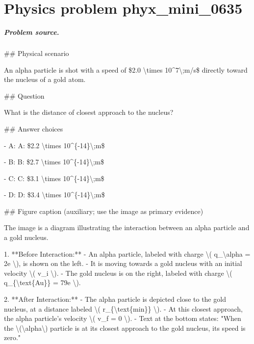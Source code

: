 
\chapter{Physics problem phyx\_mini\_0635}
\label{ch:PhyXMiniProblems_problem_phyx_mini_0635}

\paragraph{Problem source.}
\#\# Physical scenario

An alpha particle is shot with a speed of \$2.0 \textbackslash{}times 10\textasciicircum{}7\textbackslash{};m/s\$ directly toward the nucleus of a gold atom.

\#\# Question

What is the distance of closest approach to the nucleus?

\#\# Answer choices

- A: A: \$2.2 \textbackslash{}times 10\textasciicircum{}\{-14\}\textbackslash{};m\$

- B: B: \$2.7 \textbackslash{}times 10\textasciicircum{}\{-14\}\textbackslash{};m\$

- C: C: \$3.1 \textbackslash{}times 10\textasciicircum{}\{-14\}\textbackslash{};m\$

- D: D: \$3.4 \textbackslash{}times 10\textasciicircum{}\{-14\}\textbackslash{};m\$

\#\# Figure caption (auxiliary; use the image as primary evidence)

The image is a diagram illustrating the interaction between an alpha particle and a gold nucleus.

1. **Before Interaction:**
   - An alpha particle, labeled with charge \textbackslash{}( q\_\textbackslash{}alpha = 2e \textbackslash{}), is shown on the left.
   - It is moving towards a gold nucleus with an initial velocity \textbackslash{}( v\_i \textbackslash{}).
   - The gold nucleus is on the right, labeled with charge \textbackslash{}( q\_\{\textbackslash{}text\{Au\}\} = 79e \textbackslash{}).

2. **After Interaction:**
   - The alpha particle is depicted close to the gold nucleus, at a distance labeled \textbackslash{}( r\_\{\textbackslash{}text\{min\}\} \textbackslash{}).
   - At this closest approach, the alpha particle's velocity \textbackslash{}( v\_f = 0 \textbackslash{}).
   - Text at the bottom states: "When the \textbackslash{}(\textbackslash{}alpha\textbackslash{}) particle is at its closest approach to the gold nucleus, its speed is zero."

